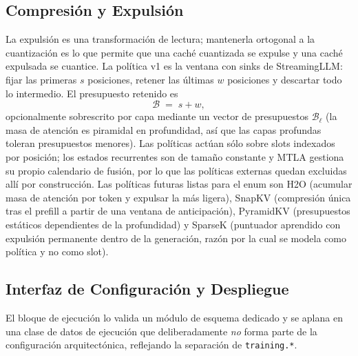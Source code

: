 \subsection{Compresión y Expulsión}
\label{sec:kv-evict}

La expulsión es una transformación de lectura; mantenerla ortogonal a la cuantización es lo que permite que una caché cuantizada se expulse y una caché expulsada se cuantice. La política v1 es la ventana con sinks de StreamingLLM: fijar las primeras $s$ posiciones, retener las últimas $w$ posiciones y descartar todo lo intermedio. El presupuesto retenido es
\[
\mathcal{B} \;=\; s + w ,
\]
opcionalmente sobrescrito por capa mediante un vector de presupuestos $\mathcal{B}_\ell$ (la masa de atención es piramidal en profundidad, así que las capas profundas toleran presupuestos menores). Las políticas actúan sólo sobre slots indexados por posición; los estados recurrentes son de tamaño constante y MTLA gestiona su propio calendario de fusión, por lo que las políticas externas quedan excluidas allí por construcción. Las políticas futuras listas para el enum son H2O (acumular masa de atención por token y expulsar la más ligera), SnapKV (compresión única tras el prefill a partir de una ventana de anticipación), PyramidKV (presupuestos estáticos dependientes de la profundidad) y SparseK (puntuador aprendido con expulsión permanente dentro de la generación, razón por la cual se modela como política y no como slot).

\subsection{Interfaz de Configuración y Despliegue}
\label{sec:kv-config}

El bloque de ejecución lo valida un módulo de esquema dedicado y se aplana en una clase de datos de ejecución que deliberadamente \emph{no} forma parte de la configuración arquitectónica, reflejando la separación de \texttt{training.*}.

